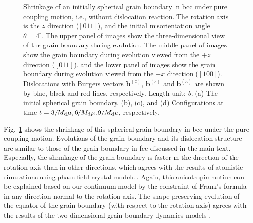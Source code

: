 \documentclass[smallextended]{svjour3}
\begin{document}
\begin{figure}[htbp]
\centering
{}
	\caption{Shrinkage of an initially spherical grain boundary in bcc under pure coupling motion, i.e., without dislocation reaction. The rotation axis is the $z$ direction ($[011]$), and the initial misorientation angle $\theta=4^\circ$. The upper panel of images show the three-dimensional view of the grain boundary during evolution. The middle panel of images show the grain boundary during evolution viewed from the $+z$ direction ($[011]$), and the lower panel of images show the grain boundary during evolution viewed from the $+x$ direction ($[100]$). Dislocations with Burgers vectors $\mathbf b^{(2)}$, $\mathbf b^{(3)}$ and $\mathbf b^{(5)}$ are shown by blue, black and red lines, respectively. Length unit: $b$. (a) The initial spherical grain boundary. (b), (c), and (d) Configurations at time $t=3/M_{\rm d}\mu, 6/M_{\rm d}\mu, 9/M_{\rm d}\mu$, respectively.
}\label{fig:bccfigure0}
\end{figure}

Fig.~\ref{fig:bccfigure0} shows the shrinkage of this spherical grain boundary in bcc under the pure coupling motion.
Evolutions of the grain boundary and its dislocation structure are similar to those of the grain boundary in fcc discussed in the main text. Especially, the shrinkage of the grain boundary is faster in the direction of the rotation axis than in other directions, which agrees with the results of atomistic simulations using phase field crystal models \cite{yamanaka2017phase,salvalaglio2018defects}. Again, this anisotropic motion can be explained based on our continuum model by the constraint of Frank's formula in any direction normal to the rotation axis. The shape-preserving evolution of the equator of the grain boundary (with respect to the rotation axis) agrees with the results of the two-dimensional grain boundary dynamics models \cite{srinivasan2002challenging,Taylor2007,wu2012phase,zhang2018motion,zhang2019new}.
\end{document}
